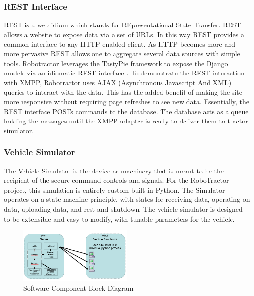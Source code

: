 \documentclass[conference,12pt]{IEEEtran}
\begin{document}
\subsubsection{REST Interface}
REST is a web idiom which stands for REpresentational State Transfer.
REST allows a website to expose data via a set of URLs. In this way REST
provides a common interface to any HTTP enabled client. As HTTP becomes more and
more pervasive REST allows one to aggregate several data sources with simple
tools. Robotractor leverages the TastyPie framework to expose the Django models
via an idiomatic REST interface \autocite{_toastdriven/django-tastypie_2014}. To
demonstrate the REST interaction with XMPP, Robotractor uses AJAX (Asynchronous
Javascript And XML) queries to interact with the data. This has the added
benefit of making the site more responsive without requiring page refreshes to
see new data. Essentially, the REST interface POSTs commands to the database.
The database acts as a queue holding the messages until the XMPP adapter is
ready to deliver them to tractor simulator.

\subsubsection{Vehicle Simulator} The Vehicle
Simulator is the device or machinery that is meant to be the recipient of the
secure command controls and signals. For the RoboTractor project, this
simulation is entirely custom built in Python. The Simulator operates on a state
machine principle, with states for receiving data, operating on data, uploading
data, and rest and shutdown. The vehicle simulator is designed to be extensible
and easy to modify, with tunable parameters for the vehicle.

\begin{figure}
\centering
\includegraphics[width=0.5\textwidth, scale=0.5]{Images/SoftwareComponentBlockDiagram.png}
\caption{Software Component Block Diagram}
\label{fig:softwarecomponents}
\end{figure}
\end{document}

